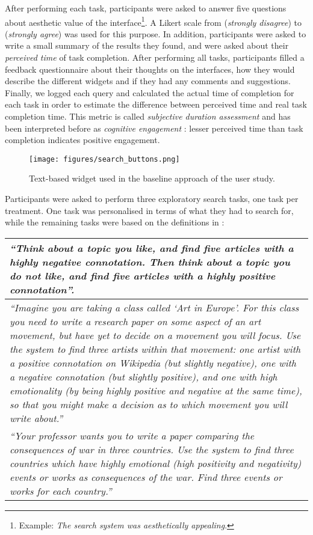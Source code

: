 \documentclass{sig-alternate}
\newcommand{\spara}[1]{\smallskip\noindent{\bf #1}}
\begin{document}
After performing each task, participants were asked to answer five questions about aesthetic value of the interface\footnote{Example: \emph{The search system was aesthetically appealing}.}. 
A Likert scale from  (\emph{strongly disagree}) to  (\emph{strongly agree}) was used for this purpose. 
In addition, participants were asked to write a small summary of the results they found, and were asked about their \emph{perceived time} \cite{o2009development} of task completion.
After performing all tasks, participants filled a feedback questionnaire about their thoughts on the interfaces, how they would describe the different widgets and if they had any comments and suggestions.
Finally, we logged each query and calculated the actual time of completion for each task in order to estimate the difference between perceived time and real task completion time. 
This metric is called \emph{subjective duration assessment} \cite{czerwinski2001subjective} and has been interpreted before as \emph{cognitive engagement} \cite{de2011identifying}: lesser perceived time than task completion indicates positive engagement.

\begin{figure}[thb]
\centering
\texttt{[image: figures/search\_buttons.png]}
\caption{Text-based widget used in the baseline approach of the user study.}
\label{fig:search_buttons}
\end{figure}

\spara{Tasks.}
Participants were asked to perform three exploratory search tasks, one task per treatment. One task was personalised in terms of what they had to search for, while the remaining tasks were based on the definitions in \cite{kules2008creating}: 

\vspace{0.1cm}
{
\centering
\scriptsize
\begin{tabulary}{0.48\textwidth}{|L|}
\toprule
\emph{``Think about a topic you like, and find five articles with a highly negative connotation. Then think about a topic you do not like, and find five articles with a highly positive connotation''.} \\
\midrule
\emph{``Imagine you are taking a class called `Art in Europe'. For this class you need to
			write a research paper on some aspect of an art movement, but have yet to decide on a movement you will focus. Use the system to find three artists within that movement: one artist with a positive connotation on Wikipedia (but slightly negative), one with a negative connotation (but slightly positive), and one with high emotionality (by being highly positive and negative at the same time),  so that you might make a decision as to which movement you will write about.''} \\
\midrule
\emph{``Your professor wants you to write a paper comparing the consequences of war in three
	countries. Use the system to find three countries which have highly emotional (high positivity and negativity) events or works as consequences of the war. Find three events or works for each country.''} \\
\bottomrule
\end{tabulary}
}
\end{document}
